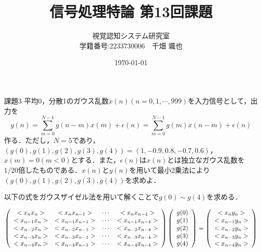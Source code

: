 \documentclass[10pt,dvipdfmx]{jarticle}
\title{信号処理特論 第13回課題}
\author{視覚認知システム研究室\\学籍番号:2233730006　千畑 颯也}
\date{\today}
\begin{document}
  \maketitle
  \begin{itembox}[l]{課題3}
    平均0，分散1のガウス乱数$x(n)(n=0,1, \cdots ,999)$を入力信号として，出力を
    \[y(n) = \sum^{N-1}_{m=0}g(n-m)x(m) + \epsilon (n) = \sum^{N-1}_{m=0}g(m)x(n-m) + \epsilon (n) \]
    作る．ただし，$N=5$であり，$(g(0),g(1),g(2),g(3),g(4))=(1,-0.9,0.8,-0.7,0.6)$，$x(m)=0(m<0)$とする．また，$\epsilon (n)$は$x(n)$とは独立なガウス乱数を$1/20$倍したものである．$x(n)$と$y(n)$を用いて最小2乗法により$(g(0),g(1),g(2),g(3),g(4))$を求めよ．
  \end{itembox}

  以下の式をガウスザイゼル法を用いて解くことで$g(0) \sim g(4)$を求める．

  \begin{eqnarray}
    \left(
    \begin{array}{cccc}
    < x_n x_n > & < x_n x_{n-1} > & \cdots & < x_n x_{n-4} > \\
    < x_{n-1} x_n > & < x_{n-1} x_{n-1} > & \cdots & < x_{n-1} x_{n-4} >\\
    < x_{n-2} x_n > & < x_{n-2} x_{n-1} > & \cdots & < x_{n-2} x_{n-4} > \\
    < x_{n-3} x_n > & < x_{n-3} x_{n-1} > & \cdots & < x_{n-3} x_{n-4} > \\
    < x_{n-4} x_n > & < x_{n-4} x_{n-1} > & \cdots & < x_{n-4} x_{n-4} > \\
    \end{array}
    \right) \left(
      \begin{array}{c}
        g(0) \\
        g(1) \\
        g(2) \\
        g(3) \\
        g(4) \\
      \end{array}
    \right) = \left(
      \begin{array}{c}
        < x_{n} y_{n} > \\
        < x_{n-1} y_{n} > \\
        < x_{n-2} y_{n} > \\
        < x_{n-3} y_{n} > \\
        < x_{n-4} y_{n} > \\
      \end{array}
    \right)  \notag
    \end{eqnarray}
\end{document}

